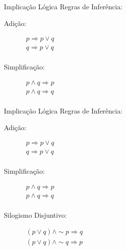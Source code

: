 \begin{frame}[t]{Implicação Lógica} %
	Regras de Inferência:
	\begin{description}
	\item[Adição:] 
		$\begin{array}{l}
		   p \Rightarrow p \vee q \\ 
		   q \Rightarrow p \vee q \\
		\end{array}$

	\item[Simplificação:] 
		$\begin{array}{l}
		  p \wedge q \Rightarrow p \\
		  p \wedge q \Rightarrow q \\
		\end{array}$
	\end{description}
\end{frame}

\begin{frame}[t]{Implicação Lógica} %
	Regras de Inferência:
	\begin{description}
	\item[Adição:] 
		$\begin{array}{l}
		   p \Rightarrow p \vee q \\ 
		   q \Rightarrow p \vee q \\
		\end{array}$

	\item[Simplificação:] 
		$\begin{array}{l}
		  p \wedge q \Rightarrow p \\
		  p \wedge q \Rightarrow q \\
		\end{array}$

	\item[Silogismo Disjuntivo:] 
		$\begin{array}{l}
		  (p \vee q) \wedge \sim p \Rightarrow q \\
		  (p \vee q) \wedge \sim q \Rightarrow p \\
		\end{array}$

	\end{description}
\end{frame}

